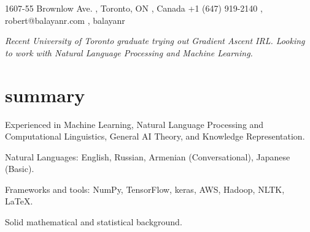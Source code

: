 \documentclass[]{cv-roald}
\begin{document}
\pagestyle{empty} %

{\faMapMarker \hspace{\FAspace} 1607-55 Brownlow Ave. \sep
Toronto, ON \sep
Canada}
{\faMobile \hspace{\FAspace} +1 (647) 919-2140 \sep
\href{mailto:robert@balayanr.com}{\faEnvelope} \hspace{\FAspace} \faSkype\hspace{\FAspace} robert@balayanr.com \sep
\href{https://www.linkedin.com/in/balayanr/}{\faLinkedinSquare} \hspace{\FAspace} \href{https://github.com/balayanr}{\faGithub} \hspace{\FAspace} \href{https://www.facebook.com/balayanr}{\faFacebookSquare} \hspace{\FAspace}\href{https://vk.com/yahhh_gf}{\faVk} \hspace{\FAspace} balayanr \FAspace  %
}
\hypersetup{
    urlcolor=blue,
}

\textit{Recent University of Toronto graduate trying out Gradient Ascent IRL. Looking to work with Natural Language Processing and Machine Learning.}

\section*{summary}
\begin{tabitemize}
    \item Experienced in Machine Learning, Natural Language Processing and Computational Linguistics, General AI Theory, and Knowledge Representation.
    \item Natural Languages: English, Russian, Armenian (Conversational), Japanese (Basic).
    \item Frameworks and tools: NumPy, TensorFlow, keras, AWS, Hadoop, NLTK, \LaTeX.
    \item Solid mathematical and statistical background.
\end{tabitemize}
\end{document}
